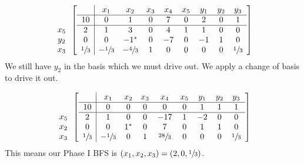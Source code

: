 \documentclass[12pt]{article}
\newenvironment{problem}[2][Problem]{\begin{trivlist}
\item[\hskip \labelsep {\bfseries #1}\hskip \labelsep {\bfseries #2.}]}{\end{trivlist}}
\theoremstyle{definition}
\begin{document}
\begin{problem}{4}
\begin{equation}
\begin{array}{c}
\\
  \\
x_5 \\
y_2 \\
x_3
\end{array}
\begin{bmatrix}
\begin{array}{c|cccccccc}
    & x_1 & x_2 & x_3 & x_4 & x_5 & y_1 & y_2 & y_3 \\ \hline
  10 & 0 & 1 & 0 & 7 & 0 & 2 & 0 & 1 \\ \hline
  2 & 1 & 3 & 0 & 4 & 1 & 1 & 0 & 0  \\
  0 & 0 & -1^* & 0 & -7 & 0 & -1 & 1 & 0  \\
  \sfrac{1}{3} & -\sfrac{1}{3} & -\sfrac{4}{3} & 1 & 0 & 0 & 0 & 0 & \sfrac{1}{3}  \\
\end{array}
\end{bmatrix}
\end{equation}
$ $ \\

We still have $y_2$ in the basis which we must drive out.
We apply a change of basis to drive it out.

\begin{equation}
\begin{array}{c}
\\
  \\
x_5 \\
x_2 \\
x_3
\end{array}
\begin{bmatrix}
\begin{array}{c|cccccccc}
    & x_1 & x_2 & x_3 & x_4 & x_5 & y_1 & y_2 & y_3 \\ \hline
  10 & 0 & 0 & 0 & 0 & 0 & 1 & 1 & 1 \\ \hline
  2 & 1 & 0 & 0 & -17 & 1 & -2 & 0 & 0  \\
  0 & 0 & 1^* & 0 & 7 & 0 & 1 & 1 & 0  \\
  \sfrac{1}{3} & -\sfrac{1}{3} & 0 & 1 & \sfrac{28}{3} & 0 & 0 & 0 & \sfrac{1}{3}  \\
\end{array}
\end{bmatrix}
\end{equation}
$ $ \\

This means our Phase I BFS is $(x_1, x_2, x_3) = (2, 0, \sfrac{1}{3})$.
\end{problem}
\end{document}
